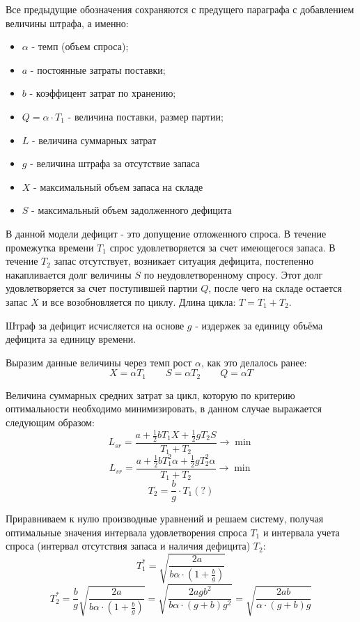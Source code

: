 \documentclass[aps,%
12pt,%
final,%
oneside,
onecolumn,%
musixtex, %
superscriptaddress,%
centertags]{article} %
\theoremstyle{plain}
\theoremstyle{definition}
\theoremstyle{remark}
\begin{document}
Все предыдущие обозначения сохраняются с предущего параграфа с добавлением величины штрафа, а именно:
\begin{itemize}
	\item $\alpha$ - темп (объем спроса);
	\item $a$ - постоянные затраты поставки;
	\item $b$ - коэффицент затрат по хранению;
	\item $Q = \alpha \cdot T_1$ - величина поставки, размер партии;
	\item $L$ - величина суммарных затрат
	\item $g$ - величина штрафа за отсутствие запаса
	\item $X$ - максимальный объем запаса на складе
	\item $S$ - максимальный объем задолженного дефицита
\end{itemize}

В данной модели дефицит - это допущение отложенного спроса. В течение промежутка времени $T_1$ спрос удовлетворяется за счет имеющегося запаса. В течение $T_2$ запас отсутствует, возникает ситуация дефицита, постепенно накапливается долг величины $S$ по неудовлетворенному спросу. Этот долг удовлетворяется за счет поступившей партии $Q$, после чего на складе остается запас $X$ и все возобновляется по циклу. Длина цикла: $T=T_1 + T_2$.

Штраф за дефицит исчисляется на основе $g$ - издержек за единицу объёма дефицита за единицу времени.

Выразим данные величины через темп рост $\alpha$, как это делалось ранее:
$$X = \alpha T_1 \qquad S = \alpha T_2 \qquad Q = \alpha T$$

Величина суммарных средних затрат за цикл, которую по критерию оптимальности необходимо минимизировать, в данном случае выражается следующим образом:
$$L_{sr} = \frac{a+\frac{1}{2}bT_1X + \frac{1}{2}g T_2 S }{T_1 + T_2} \to \min$$
$$L_{sr} = \frac{a+\frac{1}{2}bT_1^2\alpha  + \frac{1}{2}g T_2^2 \alpha }{T_1 + T_2} \to \min$$
$$T_2 = \frac{b}{g} \cdot T_1 (?)$$

Приравниваем к нулю производные уравнений и решаем систему, получая оптимальные значения интервала удовлетворения спроса $T_1$ и интервала учета спроса (интервал отсутствия запаса и наличия дефицита) $T_2$:
$$T_1^* = \sqrt{\frac{2a}{b\alpha \cdot (1+\frac{b}{g})}}$$
$$ T_2^* = \frac{b}{g}  \sqrt{\frac{2a}{b\alpha \cdot (1+\frac{b}{g})}} =  \sqrt{\frac{2agb^2}{b\alpha \cdot (g+b) g^2}} =\sqrt{\frac{2ab}{\alpha \cdot (g+b) g}} $$
\end{document}
